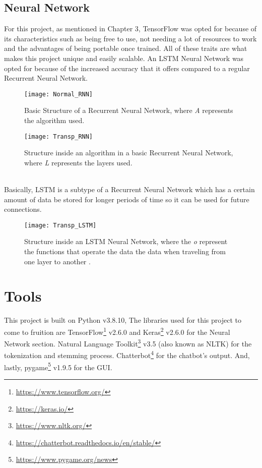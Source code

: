 \subsection{Neural Network}
For this project, as mentioned in Chapter 3, TensorFlow was opted for because of its characteristics such as being free to use, not needing a lot of resources to work and the advantages of being portable once trained. All of these traits are what makes this project unique and easily scalable.
An LSTM Neural Network was opted for because of the increased accuracy that it offers compared to a regular Recurrent Neural Network.
\begin{figure}[!b]
	\centering
	\texttt{[image: Normal\_RNN]}
	\caption{Basic Structure of a Recurrent Neural Network, where \textit{A} represents the algorithm used.}
	\label{fig:neuraldiagram_1}
\end{figure}
\begin{figure}[!bht]
	\centering
	\texttt{[image: Transp\_RNN]}
	\caption{Structure inside an algorithm in a basic Recurrent Neural Network, where \textit{L} represents the layers used.}
	\label{fig:neuraldiagram_2}
\end{figure}
\\
\indent Basically, LSTM is a subtype of a Recurrent Neural Network which has a certain amount of data be stored for longer periods of time so it can be used for future connections.
\begin{figure}[!bht]
	\centering
	\texttt{[image: Transp\_LSTM]}
	\caption{Structure inside an LSTM Neural Network, where the \textit{o} represent the functions that operate the data the data when traveling from one layer to another \citep{rf21}.}
	\label{fig:neuraldiagram_3}
\end{figure}
\pagebreak
\section{Tools}
This project is built on Python v3.8.10, The libraries used for this project to come to fruition are TensorFlow\footnote{\url{https://www.tensorflow.org/}} v2.6.0 and Keras\footnote{\url{https://keras.io/}} v2.6.0 for the Neural Network section. Natural Language Toolkit\footnote{\url{https://www.nltk.org/}} v3.5 (also known as NLTK) for the tokenization and stemming process. Chatterbot\footnote{\url{https://chatterbot.readthedocs.io/en/stable/}} for the chatbot's output. And, lastly, pygame\footnote{\url{https://www.pygame.org/news}} v1.9.5 for the GUI.

